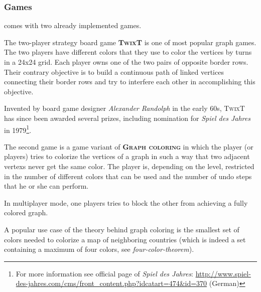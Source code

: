 \subsubsection{Games}
{\graphioli} comes with two already implemented games.\par
The two-player strategy board game \textbf{\textsc{TwixT}} is one of most popular graph games. The two players have different colors that they use to color the vertices by turns in a 24x24 grid. Each player owns one of the two pairs of opposite border rows. Their contrary objective is to build a continuous \gls{path} of linked vertices connecting their border rows and try to interfere each other in accomplishing this objective.\par
Invented by board game designer \emph{Alexander Randolph} in the early 60s, \textsc{TwixT} has since been awarded several prizes, including nomination for \emph{Spiel des Jahres} in 1979\footnote{For more information see official page of \emph{Spiel des Jahres}: \url{http://www.spiel-des-jahres.com/cms/front_content.php?idcatart=474&id=370} (German)}.\par
The second game is a game variant of \textbf{\textsc{Graph coloring}} in which the player (or players) tries to colorize the vertices of a graph in such a way that two \gls{adjacent} \glspl{vertex} never get the same color. The player is, depending on the level, restricted in the number of different colors that can be used and the number of \gls{undo} steps that he or she can perform.\par
In multiplayer mode, one players tries to block the other from achieving a fully colored graph.\par
A popular use case of the theory behind graph coloring is the smallest set of colors needed to colorize a map of neighboring countries (which is indeed a set containing a maximum of four colors, see \emph{\gls{four-color-theorem}}).\par